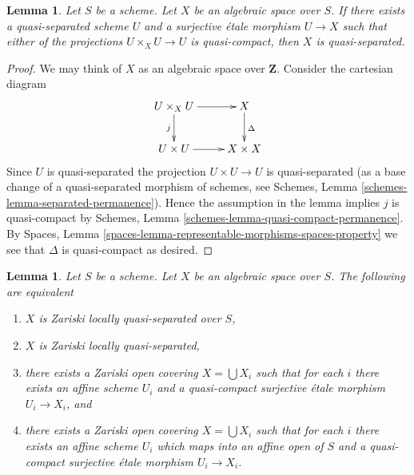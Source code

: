 \documentclass{stacks-project}
\theoremstyle{plain}
\newtheorem{lemma}[subsection]{Lemma}
\theoremstyle{definition}
\theoremstyle{remark}
\numberwithin{equation}{subsection}
\begin{document}
\begin{lemma}
\label{lemma-quasi-separated}
Let $S$ be a scheme. Let $X$ be an algebraic space over $S$.
If there exists a quasi-separated scheme $U$ and a surjective
\'etale morphism $U \to X$ such that either of the projections
$U \times_X U \to U$ is quasi-compact, then $X$ is quasi-separated.
\end{lemma}

\begin{proof}
We may think of $X$ as an algebraic space over $\mathbf{Z}$.
Consider the cartesian diagram
$$
\xymatrix{
U \times_X U \ar[r] \ar[d]_j & X \ar[d]^\Delta \\
U \times U \ar[r] & X \times X
}
$$
Since $U$ is quasi-separated the projection $U \times U \to U$ is
quasi-separated (as a base change of a quasi-separated morphism
of schemes, see Schemes, Lemma \ref{schemes-lemma-separated-permanence}).
Hence the assumption in the lemma implies $j$ is quasi-compact by
Schemes, Lemma \ref{schemes-lemma-quasi-compact-permanence}.
By Spaces, Lemma \ref{spaces-lemma-representable-morphisms-spaces-property}
we see that $\Delta$ is quasi-compact as desired.
\end{proof}

\begin{lemma}
\label{lemma-quasi-separated-quasi-compact-pieces}
Let $S$ be a scheme.
Let $X$ be an algebraic space over $S$.
The following are equivalent
\begin{enumerate}
\item $X$ is Zariski locally quasi-separated over $S$,
\item $X$ is Zariski locally quasi-separated,
\item there exists a Zariski open covering $X = \bigcup X_i$
such that for each $i$ there exists an affine scheme
$U_i$ and a quasi-compact surjective \'etale
morphism $U_i \to X_i$, and
\item there exists a Zariski open covering $X = \bigcup X_i$
such that for each $i$ there exists an affine scheme
$U_i$ which maps into an affine open of $S$ and a quasi-compact
surjective \'etale morphism $U_i \to X_i$.
\end{enumerate}
\end{lemma}
\end{document}
